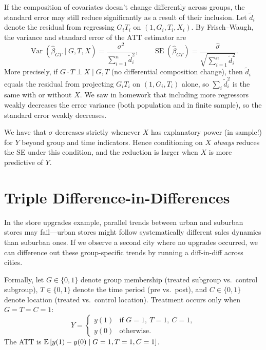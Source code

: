 If the composition of covariates doesn't change differently across groups, the standard error may still reduce significantly as a result of their inclusion. Let $\tilde{d}_i$ denote the residual from regressing $G_i T_i$ on $(1, G_i, T_i, X_i)$. By Frisch--Waugh, the variance and standard error of the ATT estimator are
\[
	\operatorname{Var}(\hat\beta_{GT} \mid G,T,X)
	= \frac{\sigma^2}{\displaystyle\sum_{i=1}^n \tilde d_i^2},
	\qquad
	\operatorname{SE}(\hat\beta_{GT})
	= \frac{\hat\sigma}{\sqrt{\displaystyle\sum_{i=1}^n \tilde d_i^2}}
.\]
More precisely, if $G \cdot T \perp X \mid G, T$ (no differential composition change), then $\tilde{d}_i$ equals the residual from projecting $G_i T_i$ on $(1, G_i, T_i)$ alone, so $\sum_i \tilde{d}_i^2$ is the same with or without $X$. We saw in homework that including more regressors weakly decreases the error variance (both population and in finite sample), so the standard error weakly decreases.

We have that $\sigma$ decreases strictly whenever $X$ has explanatory power (in sample!) for $Y$ beyond group and time indicators. Hence conditioning on $X$ \emph{always} reduces the SE under this condition, and the reduction is larger when $X$ is more predictive of $Y$.

\section{Triple Difference-in-Differences}

In the store upgrades example, parallel trends between urban and suburban stores may fail---urban stores might follow systematically different sales dynamics than suburban ones. If we observe a second city where no upgrades occurred, we can difference out these group-specific trends by running a diff-in-diff across cities.

Formally, let $G \in \{0,1\}$ denote group membership (treated subgroup vs.\ control subgroup), $T \in \{0,1\}$ denote the time period (pre vs.\ post), and $C \in \{0,1\}$ denote location (treated vs.\ control location). Treatment occurs only when $G=T=C=1$:
\[
	Y = \begin{cases} y(1) & \text{if } G=1,\ T=1,\ C=1, \\ y(0) & \text{otherwise.} \end{cases}
\]
The ATT is $\mathbb{E}\left[y(1)-y(0) \mid G=1, T=1, C=1\right]$.

